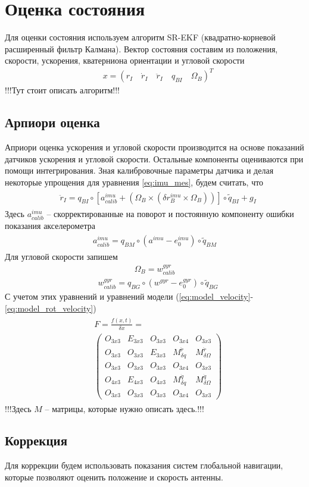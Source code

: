 \documentclass[a4paper,12pt]{article}
\begin{document}
\section{Оценка состояния}
Для оценки состояния используем алгоритм SR-EKF (квадратно-корневой расширенный фильтр Калмана). Вектор состояния составим из положения, скорости, ускорения, кватерниона ориентации и угловой скорости
\begin{align} 
&x = (r_I \quad \dot{r}_I \quad \ddot{r}_I \quad q_{BI} \quad \Omega_B)^T
\end{align}
!!!Тут стоит описать алгоритм!!!

\subsection{Арпиори оценка}
Априори оценка ускорения и угловой скорости производится на основе показаний датчиков ускорения и угловой скорости. Остальные компоненты оцениваются при помощи интегрирования.
Зная калибровочные параметры датчика и делая некоторые упрощения для уравнения \eqref{eq:imu_mes}, будем считать, что
\begin{align} 
\begin{split}
&\ddot{r}_{I} = {q}_{BI} \circ  [a^{imu}_{calib} + (\Omega_B \times (\delta r^{imu}_B \times \Omega_B))] \circ \tilde{q}_{BI} + g_I
\end{split}
\end{align}
Здесь $a^{imu}_{calib}$ -- скорректированные на поворот и постоянную компоненту ошибки показания акселерометра
\begin{align} 
\begin{split}
a^{imu}_{calib} = q_{BM} \circ (a^{imu} - e^{imu}_0) \circ \tilde{q}_{BM}
\end{split}
\end{align}
Для угловой скорости запишем
\begin{align} 
\Omega_B = w^{\textit{gyr}}_{calib}
\end{align}
\begin{align} 
&w^{\textit{gyr}}_{calib} = q_{BG} \circ (w^{\textit{gyr}} - e_0^{\textit{gyr}}) \circ \tilde{q}_{BG}
\end{align}
С учетом этих уравнений и уравнений модели  (\ref{eq:model_velocity}-\ref{eq:model_rot_velocity})
\begin{align}
\begin{split}
&F = \frac{f(x,t)}{\delta x} = \\
&\begin{pmatrix}
O_{3x3} & E_{3x3} & O_{3x3} & O_{3x4} & O_{3x3}\\
O_{3x3} & O_{3x3} & E_{3x3} & M^{\ddot{r}}_{\delta q} &M^{\ddot{r}}_{\delta \Omega}\\
O_{3x3} & O_{3x3} & O_{3x3} & O_{3x4} & O_{3x3}\\
O_{4x3} & E_{4x3} & O_{4x3} & M^{\dot{q}}_{\delta q} & M^{\dot{q}}_{\delta \Omega}\\
O_{3x3} & O_{3x3} & O_{3x3} & O_{3x4} & O_{3x3}
\end{pmatrix}
\end{split}
\end{align}
!!!Здесь $M$ -- матрицы, которые нужно описать здесь.!!!
\subsection{Коррекция}
Для коррекции будем использовать показания систем глобальной навигации, которые позволяют оценить положение и скорость антенны.
\end{document}
